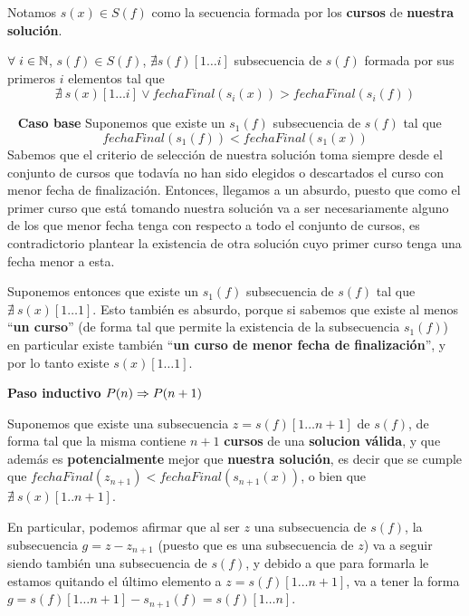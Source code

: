 \documentclass[11pt, a4paper, twoside]{article}
\begin{document}
\begin{definicion}
Notamos $s(x) \in S(f)$ como la secuencia formada por los \textbf{cursos} de \textbf{nuestra solución}.
\end{definicion}
\begin{prop}
$\forall \ i \in \mathbb{N}$, $s(f) \in S(f)$,
$\nexists s(f)[1 \dots i]$ subsecuencia de $s(f)$ formada por sus primeros $i$ elementos tal que
\[
	\nexists \ s(x)[1 \dots i] \lor fechaFinal(s_{i}(x)) > fechaFinal(s_{i}(f))
\]
\end{prop}
\begin{demostracion}\ \newline
\indent \textbf{Caso base} Suponemos que existe un $s_{1}(f)$ subsecuencia de $s(f)$ tal que
\[
	fechaFinal(s_{1}(f))<fechaFinal(s_{1}(x))
\]
Sabemos que el criterio de selección de 
nuestra solución toma siempre desde el conjunto de cursos que todavía no han sido 
elegidos o descartados el curso con menor fecha de finalización. Entonces, 
llegamos a un absurdo, puesto que como el primer curso que está tomando nuestra 
solución va a ser necesariamente alguno de los que menor fecha tenga con 
respecto a todo el conjunto de cursos, es contradictorio plantear la existencia de
otra solución cuyo primer curso tenga una fecha menor a esta. 

Suponemos entonces que existe un $s_{1}(f)$ subsecuencia de $s(f)$ tal que
$\nexists \ s(x)[1 \dots 1]$. Esto también es absurdo, porque si sabemos que existe 
al menos \enquote{\textbf{un curso}} (de forma tal que permite la existencia de la subsecuencia $s_{1}(f)$) 
en particular existe también \enquote{\textbf{un curso de menor fecha de finalización}}, y 
por lo tanto existe $s(x)[1 \dots 1]$.


\indent \textbf{Paso inductivo} $P(n) \Rightarrow P(n+1)$

Suponemos que existe una subsecuencia $z = s(f)[1 \dots n+1]$ de $s(f)$, de forma tal 
que la misma contiene $n+1$ \textbf{cursos} de una \textbf{solucion válida}, y que
además es \textbf{potencialmente} mejor que \textbf{nuestra solución}, es decir que se 
cumple que $fechaFinal(z_{n+1}) < fechaFinal(s_{n+1}(x))$, 
o bien que $\nexists \ s(x)[1..n+1]$. 

En particular, podemos afirmar que al ser $z$ una subsecuencia de $s(f)$,
la subsecuencia $g = z - z_{n+1}$ (puesto que es una subsecuencia de $z$) 
va a seguir siendo también una subsecuencia de $s(f)$, y debido a que para
formarla le estamos quitando el último elemento a $z = s(f)[1 \dots n+1]$, 
va a tener la forma $g = s(f)[1 \dots n+1] - s_{n+1}(f) = s(f)[1 \dots n]$.


\end{demostracion}
\end{document}

